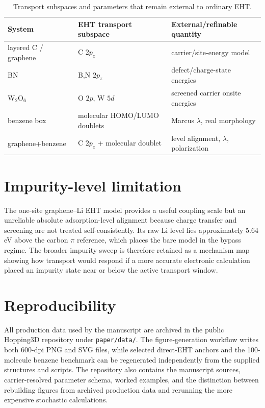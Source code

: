 \documentclass[aps,prmaterials,onecolumn,amsmath,amssymb,superscriptaddress]{revtex4-2}
\begin{document}
\begin{table}[h]
\caption{Transport subspaces and parameters that remain external to ordinary EHT.}\label{tab:presets}
\begin{ruledtabular}
\begin{tabular}{lll}
System & EHT transport subspace & External/refinable quantity\\\hline
layered C / graphene & C $2p_z$ & carrier/site-energy model\\
BN & B,N $2p_z$ & defect/charge-state energies\\
W$_2$O$_6$ & O $2p$, W $5d$ & screened carrier onsite energies\\
benzene box & molecular HOMO/LUMO doublets & Marcus $\lambda$, real morphology\\
graphene+benzene & C $2p_z$ + molecular doublet & level alignment, $\lambda$, polarization\\
\end{tabular}
\end{ruledtabular}
\end{table}

\section{Impurity-level limitation}
The one-site graphene--Li EHT model provides a useful coupling scale but an unreliable absolute adsorption-level alignment because charge transfer and screening are not treated self-consistently. Its raw Li level lies approximately 5.64 eV above the carbon $\pi$ reference, which places the bare model in the bypass regime. The broader impurity sweep is therefore retained as a mechanism map showing how transport would respond if a more accurate electronic calculation placed an impurity state near or below the active transport window.

\section{Reproducibility}
All production data used by the manuscript are archived in the public Hopping3D repository under \texttt{paper/data/}. The figure-generation workflow writes both 600-dpi PNG and SVG files, while selected direct-EHT anchors and the 100-molecule benzene benchmark can be regenerated independently from the supplied structures and scripts. The repository also contains the manuscript sources, carrier-resolved parameter schema, worked examples, and the distinction between rebuilding figures from archived production data and rerunning the more expensive stochastic calculations.
\end{document}
